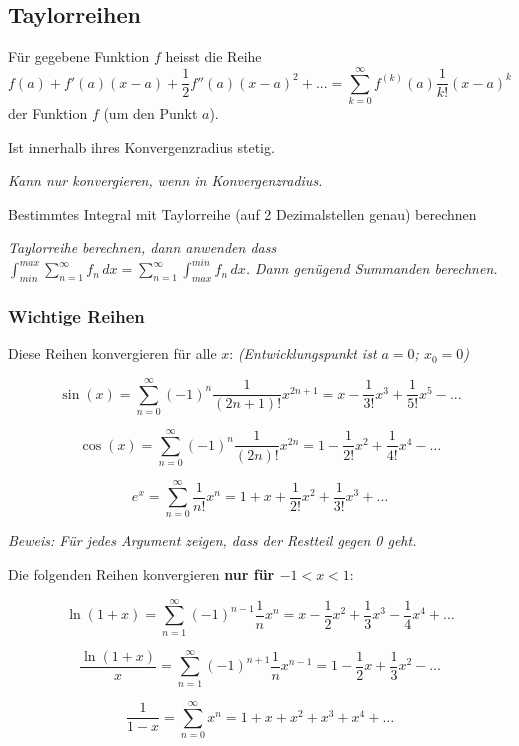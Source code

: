 \subsection{Taylorreihen}

Für gegebene Funktion $f$ heisst die Reihe
$$f(a)+f'(a)(x-a)+\frac{1}{2}f''(a)(x-a)^2+...= \sum_{k=0}^{\infty}f^{(k)}(a) \frac{1}{k!}(x-a)^k$$
 der Funktion $f$ (um den Punkt $a$).

Ist innerhalb ihres Konvergenzradius stetig.

\textit{Kann nur konvergieren, wenn in Konvergenzradius.}

\begin{exercise}
    Bestimmtes Integral mit Taylorreihe (auf 2 Dezimalstellen genau) berechnen

    \textit{Taylorreihe berechnen, dann anwenden dass $\int_{min}^{max} \sum_{n=1}^{\infty} f_n \, dx = \sum_{n=1}^{\infty} \int_{max}^{min} f_n \, dx$. Dann genügend Summanden berechnen.}
\end{exercise}

\subsubsection{Wichtige Reihen}

Diese Reihen konvergieren für alle $x$: \textit{(Entwicklungspunkt ist $a=0$; $x_0 = 0$)}

$$\sin(x)=\sum_{n=0}^{\infty}(-1)^n \frac{1}{(2n+1)!}x^{2n+1}=x-\frac{1}{3!}x^3 + \frac{1}{5!}x^5 - ...$$

$$\cos(x)=\sum_{n=0}^{\infty}(-1)^n \frac{1}{(2n)!}x^{2n}=1-\frac{1}{2!}x^2 + \frac{1}{4!}x^4 - \dots$$

$$e^x = \sum_{n=0}^{\infty}\frac{1}{n!}x^n = 1 + x + \frac{1}{2!}x^2 + \frac{1}{3!}x^3 + \dots$$

\textit{Beweis: Für jedes Argument zeigen, dass der Restteil gegen 0 geht.}

Die folgenden Reihen konvergieren \textbf{nur für $-1 < x < 1$}:

$$\ln(1+x)= \sum_{n=1}^{\infty}(-1)^{n-1}\frac{1}{n}x^n = x-\frac{1}{2}x^2 + \frac{1}{3}x^3 - \frac{1}{4}x^4 + \dots$$

{
    \color{gray}
    $$\frac{\ln(1+x)}{x} = \sum_{n=1}^{\infty} (-1)^{n+1} \frac{1}{n}x^{n-1} = 1 - \frac{1}{2} x + \frac{1}{3} x^2 - \dots$$
}

$$\frac{1}{1-x} = \sum_{n=0}^{\infty} x^n = 1 + x + x^2 + x^3 + x^4 + \dots$$

